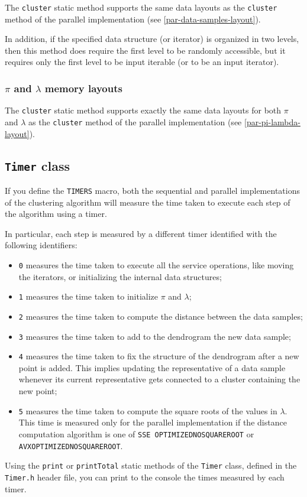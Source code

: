 \documentclass{article}
\begin{document}
The \texttt{cluster} static method supports the same data layouts as the \texttt{cluster} method
of the parallel implementation (see \ref{par-data-samples-layout}).

In addition, if the specified data structure (or iterator) is organized in two levels, then this
method does require the first level to be randomly accessible, but it requires only the first
level to be input iterable (or to be an input iterator).

\hypertarget{seq-pi-lambda-layout}{
\subsubsection{\texorpdfstring{\boldmath$\pi$ and \boldmath$\lambda$}{pi and lambda} memory layouts}
\label{seq-pi-lambda-layout}}

The \texttt{cluster} static method supports exactly the same data layouts for both $\pi$
and $\lambda$ as the \texttt{cluster} method
of the parallel implementation (see \ref{par-pi-lambda-layout}).

\hypertarget{timers}{
\subsection{\texttt{Timer} class}
\label{timer}}

If you define the \texttt{TIMERS} macro, both the sequential and parallel implementations of the
clustering algorithm will measure the time taken to execute each step of the algorithm using a
timer.

In particular, each step is measured by a different timer identified with the following identifiers:
\begin{itemize}
\item \texttt{0} measures the time taken to execute all the service operations,
like moving the iterators, or initializing the internal data structures;
\item \texttt{1} measures the time taken to initialize $\pi$ and $\lambda$;
\item \texttt{2} measures the time taken to compute the distance between the data
samples;
\item \texttt{3} measures the time taken to add to the dendrogram the new data sample;
\item \texttt{4} measures the time taken to fix the structure of the dendrogram after
a new point is added. This implies updating the representative of a data sample whenever its
current representative gets connected to a cluster containing the new point;
\item \texttt{5} measures the time taken to compute the square roots of the values in
$\lambda$. This time is measured only for the parallel implementation if the distance
computation algorithm is one of \texttt{SSE\textunderscore
OPTIMIZED\textunderscore NO\textunderscore SQUARE\textunderscore ROOT} or\\
\texttt{AVX\textunderscore OPTIMIZED\textunderscore NO\textunderscore SQUARE\textunderscore ROOT}.
\end{itemize}

Using the \texttt{print} or \texttt{printTotal} static methods of the \texttt{Timer} class,
defined in the \texttt{Timer.h} header file, you can print to the console the times measured by
each timer.
\end{document}
